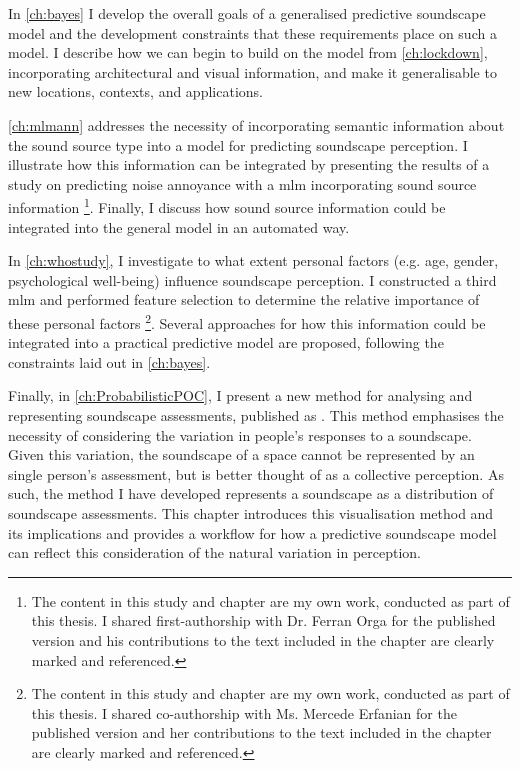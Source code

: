 \documentclass[oneside,fontsize=11pt,titlepage,chapterprefix=true
]{scrbook}
\begin{document}
In \cref{ch:bayes} I develop the overall goals of a generalised predictive soundscape model and the development constraints that these requirements place on such a model. I describe how we can begin to build on the model from \cref{ch:lockdown}, incorporating architectural and visual information, and make it generalisable to new locations, contexts, and applications.

\cref{ch:mlmann} addresses the necessity of incorporating semantic information about the sound source type into a model for predicting soundscape perception. I illustrate how this information can be integrated by presenting the results of a study on predicting noise annoyance with a \gls{mlm} incorporating sound source information \citep{Orga2021Multilevel}\footnote{The content in this study and chapter are my own work, conducted as part of this thesis. I shared first-authorship with Dr. Ferran Orga for the published version and his contributions to the text included in the chapter are clearly marked and referenced.}. Finally, I discuss how sound source information could be integrated into the general model in an automated way.

In \cref{ch:whostudy}, I investigate to what extent personal factors (e.g. age, gender, psychological well-being) influence soundscape perception. I constructed a third \gls{mlm} and performed feature selection to determine the relative importance of these personal factors \citep{Erfanian2021Psychological}\footnote{The content in this study and chapter are my own work, conducted as part of this thesis. I shared co-authorship with Ms. Mercede Erfanian for the published version and her contributions to the text included in the chapter are clearly marked and referenced.}. Several approaches for how this information could be integrated into a practical predictive model are proposed, following the constraints laid out in \cref{ch:bayes}.

Finally, in \cref{ch:ProbabilisticPOC}, I present a new method for analysing and representing soundscape assessments, published as \citet{Mitchell2022How}. This method emphasises the necessity of considering the variation in people's responses to a soundscape. Given this variation, the soundscape of a space cannot be represented by an single person's assessment, but is better thought of as a collective perception. As such, the method I have developed represents a soundscape as a distribution of soundscape assessments. This chapter introduces this visualisation method and its implications and provides a workflow for how a predictive soundscape model can reflect this consideration of the natural variation in perception.
\end{document}
